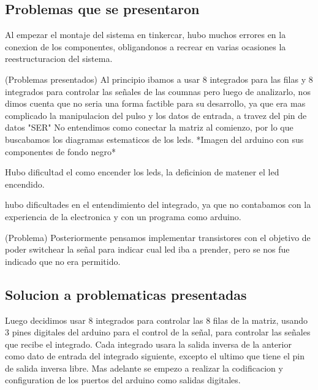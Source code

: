 \documentclass{article}
\begin{document}
 \vspace{1cm}
 


 \vspace{1cm}
 


 \vspace{1cm}



\subsection{Problemas que se presentaron}


Al empezar el montaje del sistema en tinkercar, hubo muchos errores en la conexion de los componentes, obligandonos a recrear en varias ocasiones la reestructuracion del sistema.
 \vspace{1cm}
 
 (Problemas presentados) Al principio ibamos a usar 8 integrados para las filas y 8 integrados para controlar las señales de las coumnas pero luego de analizarlo, nos dimos cuenta que no seria una forma factible para su desarrollo, ya que era mas complicado la manipulacion del pulso y los datos de entrada, a travez del pin de datos "SER"
No entendimos como conectar la matriz al comienzo, por lo que buscabamos los diagramas estematicos de los leds. 
*Imagen del arduino con sus componentes de fondo negro*

Hubo dificultad el como encender los leds, la deficinion de matener el led encendido.

hubo dificultades en el entendimiento del integrado, ya que no contabamos con la experiencia de la electronica y con un programa como arduino.


 \vspace{1cm}
 (Problema)
 Posteriormente pensamos implementar transistores con el objetivo de poder switchear la señal para indicar cual led iba a prender, pero se nos fue indicado que no era permitido.
 


 




\vspace{5cm}

\subsection{Solucion a problematicas presentadas}

 Luego decidimos usar 8 integrados para controlar las 8 filas de la matriz, usando 3 pines digitales del arduino para el control de la señal, para controlar las señales que recibe el integrado.
 Cada integrado usara la salida inversa de la anterior como dato de entrada del integrado siguiente, excepto el ultimo que tiene el pin de salida inversa libre.
 Mas adelante se empezo a realizar la codificacion y configuration de los puertos del arduino como salidas digitales. 
\end{document}
